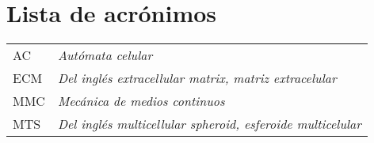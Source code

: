 \section*{Lista de acr\'onimos}
\begin{tabular}{ll}
AC& \emph{Aut\'omata celular} \\
ECM& \emph{Del ingl\'es extracellular matrix, matriz extracelular} \\
MMC& \emph{Mec\'anica de medios continuos} \\
MTS& \emph{Del ingl\'es multicellular spheroid, esferoide multicelular} \\
\end{tabular}